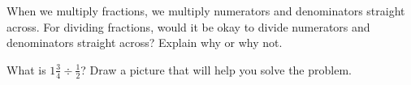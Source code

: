 \documentclass{ximera}
\begin{document}
\begin{problem}
When we multiply fractions, we multiply numerators and denominators straight across.  For dividing fractions, would it be okay to divide numerators and denominators straight across?  Explain why or why not. 
\begin{freeResponse}
\end{freeResponse}
\vfill
\end{problem}

%
%
\begin{problem}
What is $1 \frac{3}{4} \div \frac{1}{2}$?  Draw a picture that will help you solve the problem.
\begin{freeResponse}
\end{freeResponse}
\vfill
\end{problem}
%
%
%
%
%
%
%
%
\end{document}
